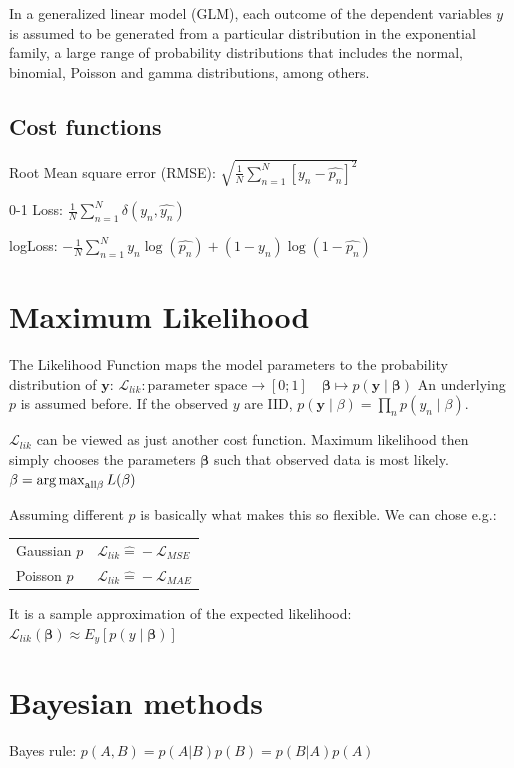 \documentclass[10pt,a4paper,landscape]{article}
\providecommand{\bf}[1]{\ensuremath{\mathbf{#1}}}
\begin{document}
\begin{multicols*}{4}
In a generalized linear model (GLM), each outcome of the dependent variables $y$ is assumed to be generated from a particular distribution in the exponential family, a large range of probability distributions that includes the normal, binomial, Poisson and gamma distributions, among others.


\subsection{Cost functions}
Root Mean square error (RMSE): $\sqrt{\frac{1}{N} \sum_{n=1}^{N}\left[y_n- \hat{p_n} \right]^2}$

0-1 Loss: $ \frac{1}{N} \sum_{n=1}^{N} \delta(y_n, \hat{y_n})$

logLoss: $- \frac{1}{N}  \sum_{n=1}^{N} y_n \log(\hat{p_n}) + (1-y_n) \log(1-\hat{p_n})$

\section{Maximum Likelihood}
The Likelihood Function maps the model parameters to the probability distribution of $\bf{y}$:
$\mathcal{L}_{lik}\colon \text{parameter space} \to [0;1]\quad  \bf{\beta} \mapsto p(\bf{y} \mid  \bf{\beta})$
An underlying $p$ is assumed before. If the observed $y$ are IID, $p(\bf{y} \mid \beta) = \prod_n p(y_n \mid \beta)$.

$\mathcal{L}_{lik}$ can be viewed as just another cost function. Maximum likelihood then simply chooses the parameters $\bf{\beta}$ such that observed data is most likely. $\beta = \operatorname*{arg\,max}_{\text{all} \beta} L(\beta)$

Assuming different $p$ is basically what makes this so flexible. We can chose e.g.:

\begin{tabular}{ l  l }
  \hline
  Gaussian $p$ & $\mathcal{L}_{lik} \widehat{=} -\mathcal{L}_{MSE}$ \\
  Poisson $p$  & $\mathcal{L}_{lik} \widehat{=} -\mathcal{L}_{MAE}$ \\
  \hline
\end{tabular}

It is a sample approximation of the expected likelihood:
$\mathcal{L}_{lik}(\boldsymbol{\beta}) \approx E_y[ p(y \mid  \boldsymbol{\beta}) ]$

\section{Bayesian methods}
Bayes rule: $p(A, B) = p(A|B) p(B) = p(B|A) p(A)$


\end{multicols*}
\end{document}
